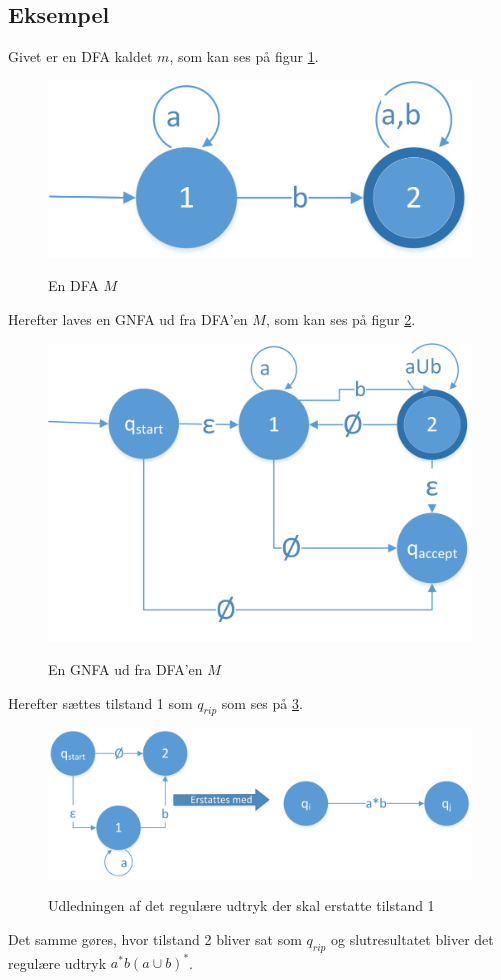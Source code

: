 \documentclass[a4paper,10pt,article]{memoir}
\begin{document}
\subsection{Eksempel}
Givet er en DFA kaldet $m$, som kan ses på figur \ref{fig:fig20}.
\begin{figure}[h]%
\centering
\includegraphics[width=\textwidth]{Fig20x.png}
\label{fig:fig20}
\caption{En DFA $M$}
\end{figure}

Herefter laves en GNFA ud fra DFA'en $M$, som kan ses på figur \ref{fig:fig21}.
\begin{figure}[h]%
\centering
\includegraphics[width=\textwidth]{Fig21x.png}
\label{fig:fig21}
\caption{En GNFA ud fra DFA'en $M$}
\end{figure}

Herefter sættes tilstand 1 som $q_{rip}$ som ses på \ref{fig:fig22}.
\begin{figure}[h]%
\centering
\includegraphics[width=\textwidth]{Fig22x.png}
\label{fig:fig22}
\caption{Udledningen af det regulære udtryk der skal erstatte tilstand 1}
\end{figure}
Det samme gøres, hvor tilstand 2 bliver sat som $q_{rip}$ og slutresultatet bliver det regulære udtryk $a^*b(a\cup b)^*$.
\end{document}
